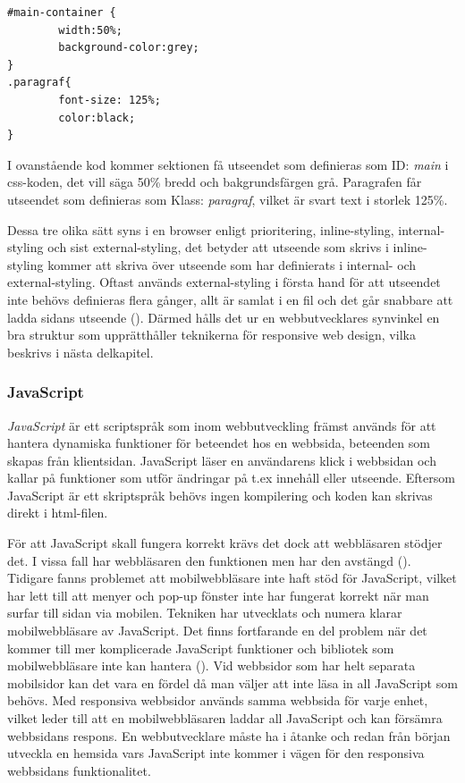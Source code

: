 \documentclass[11pt]{article}
\begin{document}
\begin{verbatim}
#main-container {
        width:50%;
        background-color:grey;
}
.paragraf{
        font-size: 125%;
        color:black;
}
\end{verbatim}
\vspace{0.5cm}

I ovanstående kod kommer sektionen få utseendet som definieras som ID: \textit{main} i css-koden, det vill säga 50\% bredd och bakgrundsfärgen grå. Paragrafen får utseendet som definieras som Klass: \textit{paragraf}, vilket är svart text i storlek 125\%.

Dessa tre olika sätt syns i en browser enligt prioritering, inline-styling, internal-styling och sist external-styling, det betyder att utseende som skrivs i inline-styling kommer att skriva över utseende som har definierats i internal- och external-styling. Oftast används external-styling i första hand för att utseendet inte behövs definieras flera gånger, allt är samlat i en fil och det går snabbare att ladda sidans utseende (\cite{css}). Därmed hålls det ur en webbutvecklares synvinkel en bra struktur som upprätthåller teknikerna för responsive web design, vilka beskrivs i nästa delkapitel.

\subsubsection{JavaScript}
\textit{JavaScript} är ett scriptspråk som inom webbutveckling främst används för att hantera dynamiska funktioner för beteendet hos en webbsida, beteenden som skapas från klientsidan. JavaScript läser en användarens klick i webbsidan och kallar på funktioner som utför ändringar på t.ex innehåll eller utseende. Eftersom JavaScript är ett skriptspråk behövs ingen kompilering och koden kan skrivas direkt i html-filen.

För att JavaScript skall fungera korrekt krävs det dock att webbläsaren stödjer det. I vissa fall har webbläsaren den funktionen men har den avstängd (\cite[s.13]{sara_ingmar}). Tidigare fanns problemet att mobilwebbläsare inte haft stöd för JavaScript, vilket har lett till att menyer och pop-up fönster inte har fungerat korrekt när man surfar till sidan via mobilen. Tekniken har utvecklats och numera klarar mobilwebbläsare av JavaScript. Det finns fortfarande en del problem när det kommer till mer komplicerade JavaScript funktioner och bibliotek som mobilwebbläsare inte kan hantera (\cite{quirksmode}). Vid webbsidor som har helt separata mobilsidor kan det vara en fördel då man väljer att inte läsa in all JavaScript som behövs. Med responsiva webbsidor används samma webbsida för varje enhet, vilket leder till att en mobilwebbläsaren laddar all JavaScript och kan försämra webbsidans respons. En webbutvecklare måste ha i åtanke och redan från början utveckla en hemsida vars JavaScript inte kommer i vägen för den responsiva webbsidans funktionalitet.
\newpage
\end{document}
